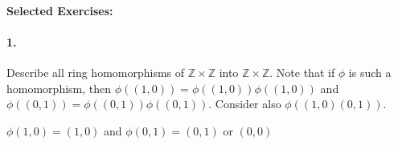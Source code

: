 \documentclass[10pt,a4paper]{article}
\begin{document}
\paragraph{Selected Exercises:}

\paragraph{1.} Describe all ring homomorphisms of $\mathbb{Z} \times \mathbb{Z}$ into $\mathbb{Z} \times \mathbb{Z}$. Note that if $\phi$ is such a homomorphism, then $\phi((1,0)) = \phi((1,0))\phi((1,0))$ and $\phi((0,1)) = \phi((0,1))\phi((0,1))$. Consider also $\phi((1,0)(0,1))$.

\begin{flushleft}
$\phi(1,0) = (1,0)$ and $\phi(0,1) = (0,1)$ or $(0,0)$
\end{flushleft}
\end{document}
